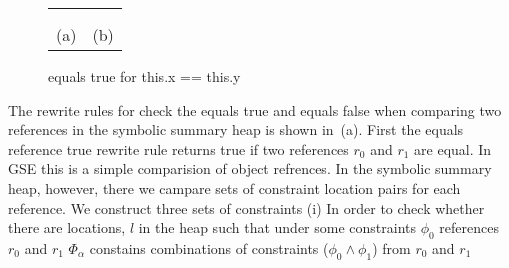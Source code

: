 \newsavebox{\boxPEX}

\begin{figure*}
\begin{tabular}[c]{cl}
\usebox{\boxPEQ} & \usebox{\boxPEX} \\ \\
(a) & (b) \\
\end{tabular}
\caption{equals true for this.x == this.y}
\label{fig:eqs}
\end{figure*}


The rewrite rules for check the equals true and equals false when
comparing two references in the symbolic summary heap is shown
in~(a). First the equals reference true rewrite rule
returns true if two references $r_0$ and $r_1$ are equal. In GSE this
is a simple comparision of object refrences. In the symbolic summary
heap, however, there we campare sets of constraint location pairs for
each reference. We construct three sets of constraints (i) In order to check whether 
there are locations, $l$ in the heap such that under some constraints $\phi_0$ references $r_0$ and $r_1$
$\Phi_\alpha$ constains combinations of constraints ($\phi_0 \wedge
\phi_1$) from $r_0$ and $r_1$
